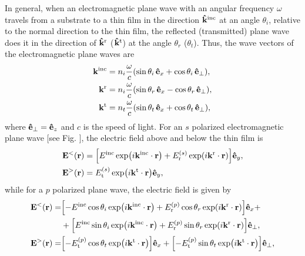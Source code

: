 In general, when an electromagnetic plane wave with an angular frequency $\omega$ travels from a substrate to a thin film in the direction $\vu{k}^\text{inc}$ at an angle $\theta_i$, relative to the normal direction to the thin film, the reflected (transmitted) plane wave does it in the direction of $\vu{k}^\text{r}$ ($\vu{k}^\text{t}$) at the angle $\theta_r$ ($\theta_t$). Thus, the wave vectors of the electromagnetic plane waves are
%
\begin{subequations}%
\begin{align}
	\vb{k}^\text{inc} &= n_i\frac{\omega}{c} (\sin\theta_i \,\vu{e}_x+ \cos\theta_i\, \vu{e}_\perp),\\
%	
	\vb{k}^\text{r} &= n_i \frac{\omega}{c} (\sin\theta_r\, \vu{e}_x- \cos\theta_r\, \vu{e}_\perp),\\
%	
	\vb{k}^\text{t} &= n_t \frac{\omega}{c} (\sin\theta_t\, \vu{e}_x+ \cos\theta_t\, \vu{e}_\perp),
\end{align}%
\label{eq:Wavevectors}%
\end{subequations}%
%
where $\vu{e}_\perp = \vu{e}_z$  and $c$ is the speed of light. For an $s$ polarized electromagnetic plane wave [see Fig. ], the electric field above and below the thin film is
%
\begin{subequations}%
\begin{align}
	\vb{E}^<(\vb{r}) &= \qty[E^\text{inc}\exp(i\vb{k}^\text{inc}\cdot\vb{r}) +
	E_\text{r}^{(s)}\exp(i\vb{k}^\text{r}\cdot\vb{r})]\vu{e}_y,\\
	\vb{E}^>(\vb{r}) &= E_\text{t}^{(s)}\exp(i\vb{k}^\text{t}\cdot\vb{r})
	\vu{e}_y,					     
\end{align}\label{eq:EsTFT}%
\end{subequations}%
%
while for a $p$ polarized plane wave, the electric field is given by
%
\begin{subequations}%
\begin{align}
	\vb{E}^<(\vb{r}) =& \qty[-E^\text{inc}\cos\theta_i\exp(i\vb{k}^\text{inc}\cdot\vb{r})
	+E_\text{r}^{(p)}\cos\theta_r\exp(i\vb{k}^\text{r}\cdot\vb{r})
	] \vu{e}_x+ \notag \\
	& +
	\qty[E^\text{inc}\sin\theta_i\exp(i\vb{k}^\text{inc}\cdot\vb{r})
	+E^{(p)}_\text{r}\sin\theta_r\exp(i\vb{k}^\text{r}\cdot\vb{r})
	] \vu{e}_\perp, \\
	\vb{E}^>(\vb{r}) =& \qty[-E^{(p)}_\text{t}\cos\theta_t\exp(i\vb{k}^\text{t}\cdot\vb{r})
	] \vu{e}_x +
	\qty[-E^{(p)}_\text{t}\sin\theta_t\exp(i\vb{k}^\text{t}\cdot\vb{r})
	] \vu{e}_\perp, 				    
\end{align}\label{eq:EpTFT}%
\end{subequations}%
